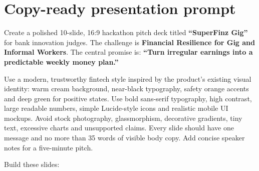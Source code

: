 \documentclass[10pt,a4paper]{article}
\begin{document}
\newpage
\section{Copy-ready presentation prompt}

\begin{accentbox}
\small
Create a polished 10-slide, 16:9 hackathon pitch deck titled \textbf{``SuperFinz Gig''} for bank innovation judges. The challenge is \textbf{Financial Resilience for Gig and Informal Workers}. The central promise is: \textbf{``Turn irregular earnings into a predictable weekly money plan.''}

Use a modern, trustworthy fintech style inspired by the product's existing visual identity: warm cream background, near-black typography, safety orange accents and deep green for positive states. Use bold sans-serif typography, high contrast, large readable numbers, simple Lucide-style icons and realistic mobile UI mockups. Avoid stock photography, glassmorphism, decorative gradients, tiny text, excessive charts and unsupported claims. Every slide should have one message and no more than 35 words of visible body copy. Add concise speaker notes for a five-minute pitch.

Build these slides:


\end{accentbox}
\end{document}
